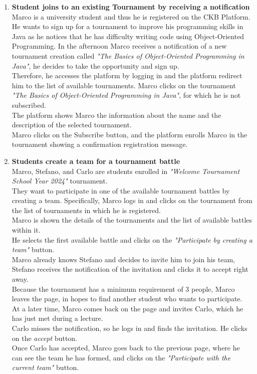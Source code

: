 \begin{enumerate}
	\item \textbf{Student joins to an existing Tournament by receiving a notification}\\
	      Marco is a university student and thus he is registered on the CKB Platform.
	      He wants to sign up for a tournament to improve his programming skills in Java as he notices that he has difficulty writing code using Object-Oriented Programming.
	      In the afternoon Marco receives a notification of a new tournament creation called \emph{"The Basics of Object-Oriented Programming in Java"}, he decides to take the opportunity and sign up.\\
	      Therefore, he accesses the platform by logging in and the platform redirect him to the list of available tournaments. Marco clicks on the tournament \emph{"The Basics of Object-Oriented Programming in Java"}, for which he is not subscribed.\\
	      The platform shows Marco the information about the name and the description of the selected tournament. \\
	      Marco clicks on the Subscribe button, and the platform enrolls Marco in the tournament showing a confirmation registration message.

	\item \textbf{Students create a team for a tournament battle}\\
	      Marco, Stefano, and Carlo are students enrolled in \emph{"Welcome Tournament School Year 2024"} tournament.\\
	      They want to participate in one of the available tournament battles by creating a team.
	      Specifically, Marco logs in and clicks on the tournament from the list of tournaments in which he is registered.\\
	      Marco is shown the details of the tournaments and the list of available battles within it.\\
	      He selects the first available battle and clicks on the \emph{"Participate by creating a team"} button.\\
	      Marco already knows Stefano and decides to invite him to join his team, Stefano receives the notification of the invitation and
	      clicks it to accept right away.\\
	      Because the tournament has a minimum requirement of 3 people, Marco leaves the page, in hopes to find another student who wants to participate.\\
	      At a later time, Marco comes back on the page and invites Carlo, which he has just met during a lecture.\\
	      Carlo misses the notification, so he logs in and finds the invitation. He clicks on the \emph{accept} button.\\
	      Once Carlo has accepted, Marco goes back to the previous page, where he can see the team he has formed,
	      and clicks on the \emph{"Participate with the current team"} button.


\end{enumerate}
